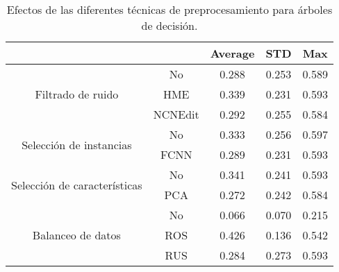 \begin{table}[t]
    \centering
    \begin{tabular}{cc|c|c|c|}
    \cline{3-5}
    \multicolumn{1}{l}{\textbf{}} & \textbf{} & \multicolumn{1}{c|}{\textbf{Average}} & \multicolumn{1}{c|}{\textbf{STD}} & \textbf{Max} \\ \hline
    \multicolumn{1}{|c|}{\multirow{3}{*}{Filtrado de ruido}}       & No        & 0.288 & 0.253
    & 0.589    \\ \cline{2-5} 
    \multicolumn{1}{|c|}{}  & HME       & 0.339 &  0.231
    & 0.593        \\ \cline{2-5} 
    \multicolumn{1}{|c|}{}  & NCNEdit   & 0.292 &  0.255
    & 0.584        \\ \hline
    \multicolumn{1}{|c|}{\multirow{2}{*}{Selección de instancias}} & No        & 0.333  & 0.256
    & 0.597        \\ \cline{2-5} 
    \multicolumn{1}{|c|}{}  & FCNN      & 0.289 &  0.231
    & 0.593        \\ \hline
    \multicolumn{1}{|c|}{\multirow{2}{*}{Selección de características}} & No        & 0.341  &  0.241
    & 0.593        \\ \cline{2-5} 
    \multicolumn{1}{|c|}{}  & PCA      & 0.272  & 0.242
    & 0.584        \\ \hline
    \multicolumn{1}{|c|}{\multirow{3}{*}{Balanceo de datos}}       & No        & 0.066  &  0.070
    & 0.215        \\ \cline{2-5} 
    \multicolumn{1}{|c|}{}  & ROS       & 0.426 &  0.136
    & 0.542        \\ \cline{2-5} 
    \multicolumn{1}{|c|}{}  & RUS       & 0.284 &  0.273
    & 0.593        \\ \hline
    \end{tabular}
    \caption{Efectos de las diferentes técnicas de preprocesamiento para árboles de decisión.}
    \label{dt}
\end{table}

